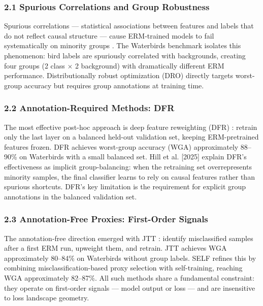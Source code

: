 
\subsubsection{2.1 Spurious Correlations and Group Robustness}

Spurious correlations --- statistical associations between features and labels that do not reflect causal structure --- cause ERM-trained models to fail systematically on minority groups \citep{sagawa2019distributionally}. The Waterbirds benchmark \citep{sagawa2019distributionally} isolates this phenomenon: bird labels are spuriously correlated with backgrounds, creating four groups (2 class $\times$ 2 background) with dramatically different ERM performance. Distributionally robust optimization (DRO) \citep{sagawa2019distributionally} directly targets worst-group accuracy but requires group annotations at training time.

\subsubsection{2.2 Annotation-Required Methods: DFR}

The most effective post-hoc approach is deep feature reweighting (DFR) \citep{kirichenko2022last}: retrain only the last layer on a balanced held-out validation set, keeping ERM-pretrained features frozen. DFR achieves worst-group accuracy (WGA) approximately 88--90\% on Waterbirds with a small balanced set. Hill et al. [2025] explain DFR's effectiveness as implicit group-balancing: when the retraining set overrepresents minority samples, the final classifier learns to rely on causal features rather than spurious shortcuts. DFR's key limitation is the requirement for explicit group annotations in the balanced validation set.

\subsubsection{2.3 Annotation-Free Proxies: First-Order Signals}

The annotation-free direction emerged with JTT \citep{liu2021just}: identify misclassified samples after a first ERM run, upweight them, and retrain. JTT achieves WGA approximately 80--84\% on Waterbirds without group labels. SELF \citep{labonte2023towards} refines this by combining misclassification-based proxy selection with self-training, reaching WGA approximately 82--87\%. All such methods share a fundamental constraint: they operate on first-order signals --- model output or loss --- and are insensitive to loss landscape geometry.

